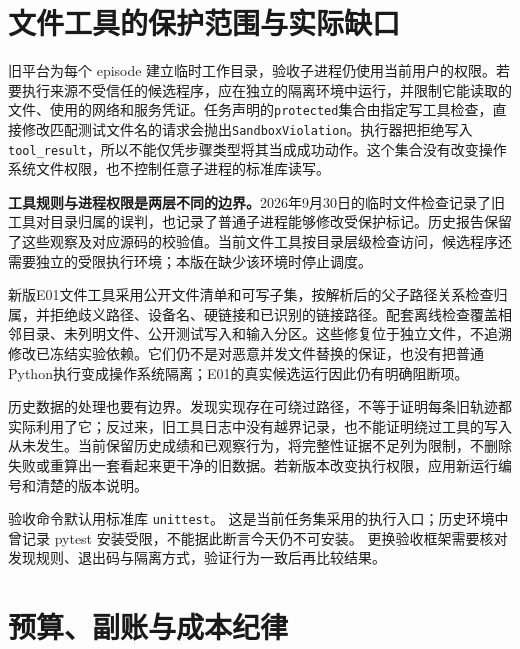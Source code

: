 \section{文件工具的保护范围与实际缺口}
\label{sec:appb-sandbox}

旧平台为每个 episode 建立临时工作目录，验收子进程仍使用当前用户的权限。若要执行来源不受信任的候选程序，应在独立的隔离环境中运行，并限制它能读取的文件、使用的网络和服务凭证。任务声明的\texttt{protected}集合由指定写工具检查，直接修改匹配测试文件名的请求会抛出\texttt{SandboxViolation}。执行器把拒绝写入\texttt{tool\_result}，所以不能仅凭步骤类型将其当成成功动作。这个集合没有改变操作系统文件权限，也不控制任意子进程的标准库读写。

\begin{sloppypar}
\textbf{工具规则与进程权限是两层不同的边界。}2026年9月30日的临时文件检查记录了旧工具对目录归属的误判，也记录了普通子进程能够修改受保护标记。历史报告保留了这些观察及对应源码的校验值。当前文件工具按目录层级检查访问，候选程序还需要独立的受限执行环境；本版在缺少该环境时停止调度。
\end{sloppypar}

新版E01文件工具采用公开文件清单和可写子集，按解析后的父子路径关系检查归属，并拒绝歧义路径、设备名、硬链接和已识别的链接路径。配套离线检查覆盖相邻目录、未列明文件、公开测试写入和输入分区。这些修复位于独立文件，不追溯修改已冻结实验依赖。它们仍不是对恶意并发文件替换的保证，也没有把普通Python执行变成操作系统隔离；E01的真实候选运行因此仍有明确阻断项。

历史数据的处理也要有边界。发现实现存在可绕过路径，不等于证明每条旧轨迹都实际利用了它；反过来，旧工具日志中没有越界记录，也不能证明绕过工具的写入从未发生。当前保留历史成绩和已观察行为，将完整性证据不足列为限制，不删除失败或重算出一套看起来更干净的旧数据。若新版本改变执行权限，应用新运行编号和清楚的版本说明。

验收命令默认用标准库 \texttt{unittest}。
这是当前任务集采用的执行入口；历史环境中曾记录 pytest 安装受限，不能据此断言今天仍不可安装。
更换验收框架需要核对发现规则、退出码与隔离方式，验证行为一致后再比较结果。

\section{预算、副账与成本纪律}
\label{sec:appb-budget}

